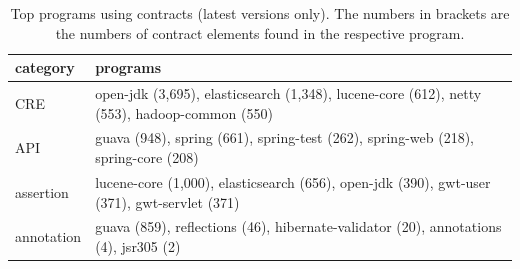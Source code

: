 \begin{table}[t!]
\centering
\caption{Top programs using contracts (latest versions only). The numbers in brackets are the numbers of contract elements found in the respective program.}
\label{tab:topusers}
\begin{tabular}{|p{2.5cm}|p{10.5cm}|} \hline
   category & programs \\ \hline
CRE & open-jdk (3,695), elasticsearch (1,348), lucene-core (612), netty (553), hadoop-common (550) \\ 
API & guava (948), spring (661), spring-test (262), spring-web (218), spring-core (208) \\ 
assertion & lucene-core (1,000), elasticsearch (656), open-jdk (390), gwt-user (371), gwt-servlet (371) \\ 
annotation & guava (859), reflections (46), hibernate-validator (20), annotations (4), jsr305 (2) \\ 
\hline
\end{tabular}
\end{table}
